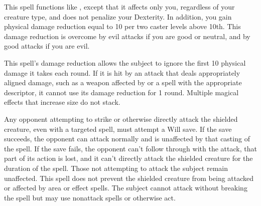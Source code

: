 \begin{spelleffect}
  This spell functions like , except that it affects only you, regardless of your creature type, and does not penalize your Dexterity. In addition, you gain physical damage reduction equal to 10  per two caster levels above 10th. This damage reduction is overcome by evil attacks if you are good or neutral, and by good attacks if you are evil.
\end{spelleffect}
\begin{spellnotes}
  This spell's damage reduction allows the subject to ignore the first 10 physical damage it takes each round. If it is hit by an attack that deals appropriately aligned damage, such as a weapon affected by  or a spell with the appropriate descriptor, it cannot use its damage reduction for 1 round.
  Multiple magical effects that increase size do not stack.
\end{spellnotes}

\spelldur{\durshort}
\begin{spelleffect}
  Any opponent attempting to strike or otherwise directly attack the shielded creature, even with a targeted spell, must attempt a Will save. If the save succeeds, the opponent can attack normally and is unaffected by that casting of the spell. If the save fails, the opponent can't follow through with the attack, that part of its action is lost, and it can't directly attack the shielded creature for the duration of the spell. Those not attempting to attack the subject remain unaffected. This spell does not prevent the shielded creature from being attacked or affected by area or effect spells. The subject cannot attack without breaking the spell but may use nonattack spells or otherwise act.
\end{spelleffect}

\begin{comment}
\subsubsection{S}
\end{comment}

